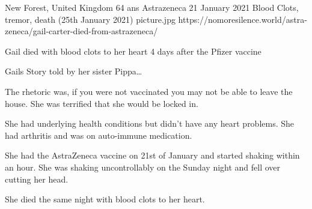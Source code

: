           {New Forest, United Kingdom}
          {64 ans}
          {Astrazeneca}
          {21 January 2021}
          {Blood Clots, tremor, death (25th January 2021)}
          {picture.jpg}
          {https://nomoresilence.world/astra-zeneca/gail-carter-died-from-astrazeneca/}
          {

Gail died with blood clots to her heart 4 days after the Pfizer vaccine

Gails Story told by her sister Pippa…

The rhetoric was, if you were not vaccinated you may not be able to leave the
house. She was terrified that she would be locked in.

She had underlying health conditions but didn’t have any heart problems. She had
arthritis and was on auto-immune medication.

She had the AstraZeneca vaccine on 21st of January and started shaking within an
hour. She was shaking uncontrollably on the Sunday night and fell over cutting
her head.

She died the same night with blood clots to her heart.

}
